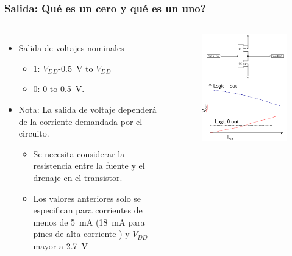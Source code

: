 \documentclass[10.5pt,scale=1.0,t,aspectratio=169,hyperref={pdfpagelabels=false}]{beamer}
\begin{document}
\begin{frame}
	\frametitle{Salida: Qué es un cero y qué es un uno?}
	\begin{columns}
		\begin{itemize}
			\item Salida de voltajes nominales
			\begin{itemize}
				\item 1: $V_{DD}$-\SI{0.5}{\volt} to $V_{DD}$
				\item 0: 0 to \SI{0.5}{\volt}.
			\end{itemize}
			\item Nota: La salida de voltaje dependerá de la corriente demandada por el circuito.
			\begin{itemize}
				\item Se necesita considerar la resistencia entre la fuente y el drenaje en el transistor. 
				\item Los valores anteriores solo se especifican para corrientes de menos de \SI{5}{\milli\ampere} (\SI{18}{\milli\ampere} para pines de alta corriente ) y $V_{DD}$ mayor a \SI{2.7}{\volt}
			\end{itemize}
		\end{itemize}
		\begin{figure}
			\centering
			\includegraphics[scale=0.35]{03_OutputDrain}
		\end{figure}
	\end{columns}
\end{frame}
\end{document}
